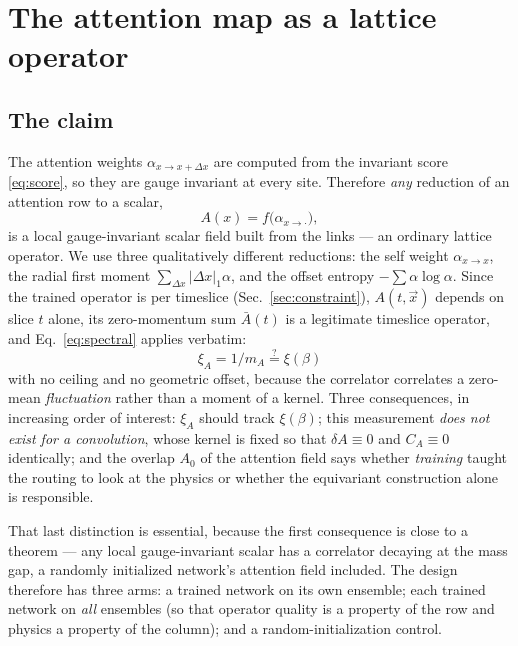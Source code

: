 \documentclass[aps,prl,reprint,superscriptaddress,nofootinbib]{revtex4-2}
\newcommand{\Abar}{\bar{A}}
\newcommand{\xiA}{\xi_A}
\begin{document}
\section{The attention map as a lattice operator}
\label{sec:attnop}

\subsection{The claim}

The attention weights $\alpha_{x\to x+\Delta x}$ are computed from the invariant
score \eqref{eq:score}, so they are gauge invariant at every site. Therefore
\emph{any} reduction of an attention row to a scalar,
\begin{equation}
  A(x)=f\big(\alpha_{x\to\cdot}\big),
  \label{eq:reduction}
\end{equation}
is a local gauge-invariant scalar field built from the links --- an ordinary
lattice operator. We use three qualitatively different reductions: the self
weight $\alpha_{x\to x}$, the radial first moment
$\sum_{\Delta x}|\Delta x|_1\alpha$, and the offset entropy
$-\sum\alpha\log\alpha$. Since the trained operator is per timeslice
(Sec.~\ref{sec:constraint}), $A(t,\vec x)$ depends on slice $t$ alone, its
zero-momentum sum $\Abar(t)$ is a legitimate timeslice operator, and
Eq.~\eqref{eq:spectral} applies verbatim:
\begin{equation}
  \boxed{\ \xiA=1/m_A \overset{?}{=} \xi(\beta)\ }
\end{equation}
with no ceiling and no geometric offset, because the correlator correlates a
zero-mean \emph{fluctuation} rather than a moment of a kernel. Three
consequences, in increasing order of interest: $\xiA$ should track $\xi(\beta)$;
this measurement \emph{does not exist for a convolution}, whose kernel is fixed
so that $\delta A\equiv0$ and $C_A\equiv0$ identically; and the overlap $A_0$ of
the attention field says whether \emph{training} taught the routing to look at
the physics or whether the equivariant construction alone is responsible.

That last distinction is essential, because the first consequence is close to a
theorem --- any local gauge-invariant scalar has a correlator decaying at the
mass gap, a randomly initialized network's attention field included. The design
therefore has three arms: a trained network on its own ensemble; each trained
network on \emph{all} ensembles (so that operator quality is a property of the
row and physics a property of the column); and a random-initialization control.
\end{document}
